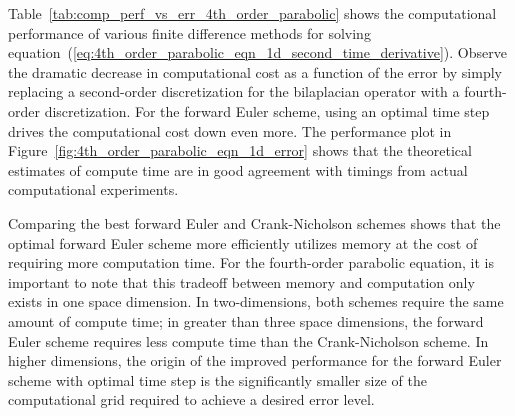 \documentclass[oneeqnum,onefignum,onetabnum,onethmnum]{siamltex}
\begin{document}
Table~\ref{tab:comp_perf_vs_err_4th_order_parabolic} shows the computational 
performance of various finite difference methods for solving 
equation~(\ref{eq:4th_order_parabolic_eqn_1d_second_time_derivative}).
Observe the dramatic decrease in computational cost as a function of the
error by simply replacing a second-order discretization for the bilaplacian 
operator with a fourth-order discretization.  For the forward Euler scheme,
using an optimal time step drives the computational cost down even more.
The performance plot in Figure~\ref{fig:4th_order_parabolic_eqn_1d_error} 
shows that the theoretical estimates of compute time are in good agreement 
with timings from actual computational experiments.

Comparing the best forward Euler and Crank-Nicholson schemes shows that
the optimal forward Euler scheme more efficiently utilizes memory at the
cost of requiring more computation time.  For the fourth-order parabolic 
equation, it is important to note that this tradeoff between memory and 
computation only exists in one space dimension.  In two-dimensions, both 
schemes require the same amount of compute time; in greater than three space 
dimensions, the forward Euler scheme requires less compute time than the
Crank-Nicholson scheme.  In higher dimensions, the origin of the improved 
performance for the forward Euler scheme with optimal time step is the 
significantly smaller size of the computational grid required to achieve a 
desired error level.
\end{document}
